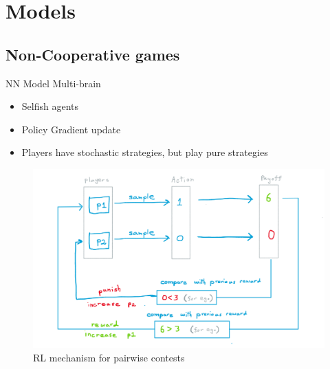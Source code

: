 \documentclass{IFES-beamer}
\begin{document}
\section{Models}
    \subsection{Non-Cooperative games}
        \begin{frame}{NN Model Multi-brain}
                \begin{itemize}
                    \item Selfish agents
                    \item Policy Gradient update
                    \item Players have stochastic strategies, but play pure strategies
                \end{itemize}
                \begin{figure}[H]
                \centering
                \includegraphics[scale=0.35]{Images/no_coop.png}
                \caption{RL mechanism for pairwise contests}
            \end{figure}
        \end{frame}
\end{document}
